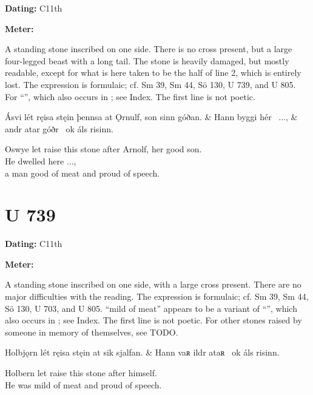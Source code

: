 \begin{flushright}%
\textbf{Dating:} C11th

\textbf{Meter:} \Fornyrdislag
\end{flushright}%

A standing stone inscribed on one side.  There is no cross present, but a large four-legged beast with a long tail.  The stone is heavily damaged, but mostly readable, except for what is here taken to be the half of line 2, which is entirely lost.  The expression is formulaic; cf. Sm 39, Sm 44, Sö 130, U 739, and U 805.  For “”, which also occurs in \Havamal; see Index.  The first line is not poetic.

\sectionline

\bvg\bva[]%
Ásvi lét ręisa stęin þennsa at Ǫrnulf, son sinn góðan. &
Hann byggi hér \hld\ ..., &
andr atar góðr \hld\ ok áls risinn.\eva

\bvb Oswye let raise this stone after Arnolf, her good son. \\
He dwelled here ..., \\
a man good of meat and proud of speech.\evb\evg

\sectionline

\section{U 739}

\begin{flushright}%
\textbf{Dating:} C11th

\textbf{Meter:} \Fornyrdislag
\end{flushright}%

A standing stone inscribed on one side, with a large cross present.  There are no major difficulties with the reading.  The expression is formulaic; cf. Sm 39, Sm 44, Sö 130, U 703, and U 805.  “mild of meat” appears to be a variant of “”, which also occurs in \Havamal; see Index.  The first line is not poetic.  For other stones raised by someone in memory of themselves, see TODO.

\sectionline

\bvg\bva[]%
Holbjǫrn lét ręisa stęin at sik sjalfan. &
Hann vaʀ ildr ataʀ \hld\ ok áls risinn.\eva

\bvb Holbern let raise this stone after himself. \\
He was mild of meat and proud of speech.\evb\evg


